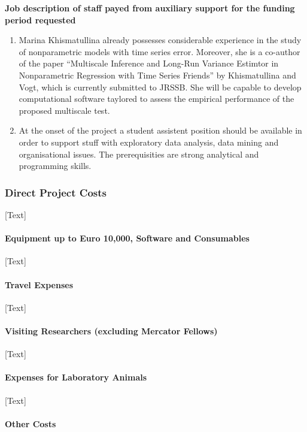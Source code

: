 \documentclass[a4paper,12pt]{article}
\begin{document}
\begin{itemize}[label=--,leftmargin=0.5cm]
{\bf Job description of staff payed from auxiliary support for the funding period requested }

\begin{enumerate}
	\item Marina Khismatullina already possesses considerable experience in the study of nonparametric models with time series error. Moreover, she is a co-author of the paper ``Multiscale Inference and Long-Run Variance Estimtor in Nonparametric Regression with Time Series Friends'' by Khismatullina and Vogt, which is currently submitted to JRSSB. She will be capable to develop computational software taylored to assess the empirical performance of the proposed multiscale test.
	\item At the onset of the project a student assistent position should be available in order to
support stuff with exploratory data analysis, data mining and organisational issues. The
prerequisities are strong analytical and programming skills.
\end{enumerate}

\subsubsection{Direct Project Costs}

[Text]

\paragraph{Equipment up to Euro 10,000, Software and Consumables}

[Text]

\paragraph{Travel Expenses}

[Text]

\paragraph{Visiting Researchers (excluding Mercator Fellows)}

[Text]

\paragraph{Expenses for Laboratory Animals}

[Text]

\paragraph{Other Costs}


\end{itemize}
\end{document}
